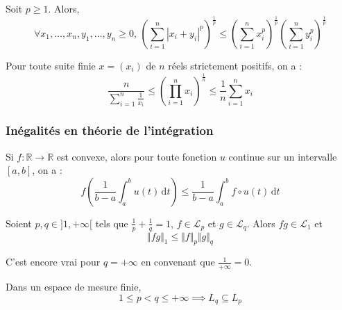   \begin{proposition}
    Soit $p \geq 1$. Alors,
    \[ \forall x_1, \dots, x_n, y_1, \dots, y_n \geq 0, \, \left( \sum_{i=1}^n |x_i + y_i|^p \right)^{\frac{1}{p}} \leq \left( \sum_{i=1}^n x_i^p \right)^{\frac{1}{p}} \left( \sum_{i=1}^n y_i^p \right)^{\frac{1}{p}} \]
  \end{proposition}


  \begin{proposition}
    Pour toute suite finie $x = (x_i)$ de $n$ réels strictement positifs, on a :
    \[ \frac{n}{\sum_{i=1}^n \frac{1}{x_i}} \leq \left( \prod_{i=1}^n x_i \right)^{\frac{1}{n}} \leq \frac{1}{n} \sum_{i=1}^n x_i \]
  \end{proposition}

  \subsubsection{Inégalités en théorie de l'intégration}

  \begin{proposition}
    Si $f : \mathbb{R} \rightarrow \mathbb{R}$ est convexe, alors pour toute fonction $u$ continue sur un intervalle $[a, b]$, on a :
    \[ f \left( \frac{1}{b-a} \int_a^b u(t) \, \mathrm{d}t \right) \leq \frac{1}{b-a} \int_a^b f \circ u (t) \, \mathrm{d}t \]
  \end{proposition}


  \begin{theorem}
    Soient $p, q \in ]1, +\infty[$ tels que $\frac{1}{p} + \frac{1}{q} = 1$, $f \in \mathcal{L}_p$ et $g \in \mathcal{L}_q$. Alors $fg \in \mathcal{L}_1$ et
    \[ \Vert fg \Vert_1 \leq \Vert f \Vert_p \Vert g \Vert_q \]
  \end{theorem}

  \begin{remark}
    C'est encore vrai pour $q = +\infty$ en convenant que $\frac{1}{+\infty} = 0$.
  \end{remark}

  \begin{application}
    Dans un espace de mesure finie,
    \[ 1 \leq p < q \leq +\infty \implies L_q \subseteq L_p \]
  \end{application}

